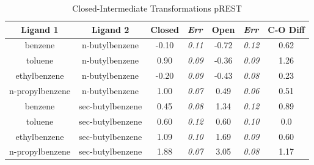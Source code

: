 \documentclass[journal=jctcce,manuscript=article]{achemso}
\begin{document}
\begin{table}[!htb]
\centering
\caption{Closed-Intermediate Transformations pREST}
\label{tbl:C-I_pREST}
\begin{tabular}{|c|c|c|l|c|l|c|}
\hline
\textbf{Ligand 1}                       & \textbf{Ligand 2}                        & {\color[HTML]{800080} \textbf{Closed}} & {\color[HTML]{800080} \textit{Err}} & {\color[HTML]{008000} \textbf{Open}} & {\color[HTML]{008000} \textit{Err}} & \textbf{C-O Diff}            \\ \hline
\cellcolor[HTML]{800080}benzene         & \cellcolor[HTML]{00FFFF}n-butylbenzene   & -0.10                                   & \textit{0.11}                       & -0.72                                & \textit{0.12}                       & \cellcolor[HTML]{FFCCC9}0.62 \\ \hline
\cellcolor[HTML]{800080}toluene         & \cellcolor[HTML]{00FFFF}n-butylbenzene   & 0.90                                  & \textit{0.09}                       & -0.36                                & \textit{0.09}                       & \cellcolor[HTML]{9AFF99}1.26 \\ \hline
\cellcolor[HTML]{800080}ethylbenzene    & \cellcolor[HTML]{00FFFF}n-butylbenzene   & -0.20                                   & \textit{0.09}                       & -0.43                                & \textit{0.08}                       & \cellcolor[HTML]{9AFF99}0.23 \\ \hline
\cellcolor[HTML]{800080}n-propylbenzene & \cellcolor[HTML]{00FFFF}n-butylbenzene   & 1.00                                  & \textit{0.07}                       & 0.49                                 & \textit{0.06}                       & \cellcolor[HTML]{9AFF99}0.51 \\ \hline
\cellcolor[HTML]{800080}benzene         & \cellcolor[HTML]{00FFFF}sec-butylbenzene & 0.45                                   & \textit{0.08}                       & 1.34                                 & \textit{0.12}                       & \cellcolor[HTML]{9AFF99}0.89 \\ \hline
\cellcolor[HTML]{800080}toluene         & \cellcolor[HTML]{00FFFF}sec-butylbenzene & 0.60                                   & \textit{0.12}                       & 0.60                                 & \textit{0.10}                       & \cellcolor[HTML]{9AFF99}0.0 \\ \hline
\cellcolor[HTML]{800080}ethylbenzene    & \cellcolor[HTML]{00FFFF}sec-butylbenzene & 1.09                                   & \textit{0.10}                       & 1.69                                 & \textit{0.09}                       & \cellcolor[HTML]{9AFF99}0.60 \\ \hline
\cellcolor[HTML]{800080}n-propylbenzene & \cellcolor[HTML]{00FFFF}sec-butylbenzene & 1.88                                   & \textit{0.07}                       & 3.05                                 & \textit{0.08}                       & \cellcolor[HTML]{9AFF99}1.17 \\ \hline
\end{tabular}
\end{table}
\end{document}
